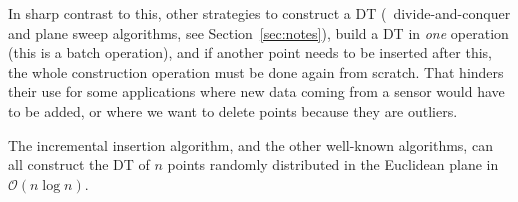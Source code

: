 %

In sharp contrast to this, other strategies to construct a DT (\eg\ divide-and-conquer and plane sweep algorithms, see Section~\ref{sec:notes}), build a DT in \emph{one} operation (this is a batch operation), and if another point needs to be inserted after this, the whole construction operation must be done again from scratch. 
That hinders their use for some applications where new data coming from a sensor would have to be added, or where we want to delete points because they are outliers.

%

The incremental insertion algorithm, and the other well-known algorithms, can all construct the DT of $n$ points randomly distributed in the Euclidean plane in $\mathcal{O}(n \log n)$.

%

